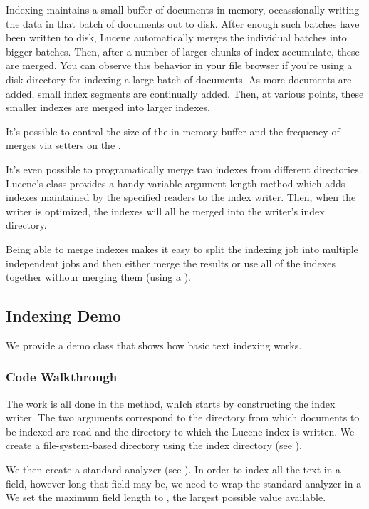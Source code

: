 Indexing maintains a small buffer of documents in memory,
occassionally writing the data in that batch of documents out to disk.
After enough such batches have been written to disk, Lucene
automatically merges the individual batches into bigger batches.
Then, after a number of larger chunks of index accumulate, these are
merged.  You can observe this behavior in your file browser if you're
using a disk directory for indexing a large batch of documents.  As
more documents are added, small index segments are continually added.
Then, at various points, these smaller indexes are merged into larger
indexes.

It's possible to control the size of the in-memory buffer and the
frequency of merges via setters on the .

It's even possible to programatically merge two indexes from different
directories.  Lucene's  class provides a handy
variable-argument-length method 
which adds indexes maintained by the specified readers to the index
writer.  Then, when the writer is optimized, the indexes will all
be merged into the writer's index directory.  

Being able to merge indexes makes it easy to split the indexing job
into multiple independent jobs and then either merge the results or
use all of the indexes together withour merging them (using a
).


\subsection{Indexing Demo}

We provide a demo class  that shows how basic
text indexing works.  

\subsubsection{Code Walkthrough}

The work is all done in the  method, whIch starts by
constructing the index writer.
%
%
The two arguments correspond to the directory from which documents to
be indexed are read and the directory to which the Lucene index is
written.  We create a file-system-based directory using the index
directory (see ).  

We then create a standard analyzer (see ).
In order to index all the text in a field, however long that field may be,
we need to wrap the standard analyzer in a 
We set the maximum field length to , the
largest possible value available.  

